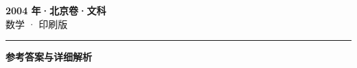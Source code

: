 \documentclass[zihao=5, a4paper]{ctexart}
\begin{document}
\begin{center}
  {\Large\bfseries 2004 年·北京卷·文科}\\[4pt]
  {\large 数学 · 印刷版}
\end{center}
\medskip
{}

\par\bigskip\hrule\bigskip
{}
\begin{center}{\large\bfseries 参考答案与详细解析}\end{center}
\smallskip

\end{document}
